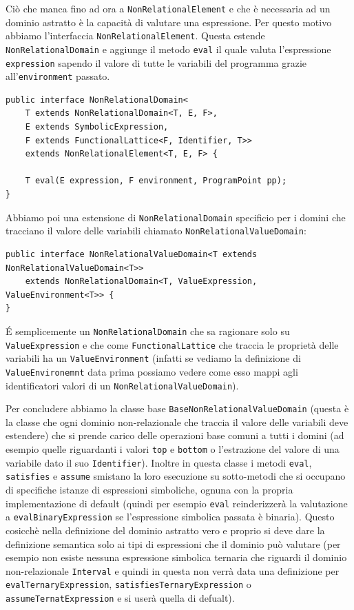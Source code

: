 \noindent Ciò che manca fino ad ora a \texttt{NonRelationalElement} e che è necessaria ad un dominio astratto è la capacità di valutare una espressione. Per questo motivo abbiamo l'interfaccia \texttt{NonRelationalElement}. Questa estende \texttt{NonRelationalDomain} e aggiunge il metodo \texttt{eval} il quale valuta l'espressione \texttt{expression} sapendo il valore di tutte le variabili del programma grazie all'\texttt{environment} passato.
\begin{lstlisting}[belowskip=-1.1 \baselineskip]
public interface NonRelationalDomain<
    T extends NonRelationalDomain<T, E, F>,
    E extends SymbolicExpression,
    F extends FunctionalLattice<F, Identifier, T>>
    extends NonRelationalElement<T, E, F> {

    T eval(E expression, F environment, ProgramPoint pp);
}
\end{lstlisting}
Abbiamo poi una estensione di \texttt{NonRelationalDomain} specificio per i domini che tracciano il valore delle variabili chiamato \texttt{NonRelationalValueDomain}:
\begin{lstlisting}[belowskip=-1.1 \baselineskip]
public interface NonRelationalValueDomain<T extends NonRelationalValueDomain<T>>
    extends NonRelationalDomain<T, ValueExpression, ValueEnvironment<T>> {
}
\end{lstlisting}
\'E semplicemente un \texttt{NonRelationalDomain} che sa ragionare solo su \texttt{ValueExpression} e che come \texttt{FunctionalLattice} che traccia le proprietà delle variabili ha un \texttt{ValueEnvironment} (infatti se vediamo la definizione di \texttt{ValueEnvironemnt} data prima possiamo vedere come esso mappi agli identificatori valori di un \texttt{NonRelationalValueDomain}).

Per concludere abbiamo la classe base \texttt{BaseNonRelationalValueDomain} (questa è la classe che ogni dominio non-relazionale che traccia il valore delle variabili deve estendere) che si prende carico delle operazioni base comuni a tutti i domini (ad esempio quelle riguardanti i valori \texttt{top} e \texttt{bottom} o l'estrazione del valore di una variabile dato il suo \texttt{Identifier}). Inoltre in questa classe i metodi \texttt{eval}, \texttt{satisfies} e \texttt{assume} smistano la loro esecuzione su sotto-metodi che si occupano di specifiche istanze di espressioni simboliche, ognuna con la propria implementazione di default (quindi per esempio \texttt{eval} reinderizzerà la valutazione a \texttt{evalBinaryExpression} se l'espressione simbolica passata è binaria). Questo cosicchè nella definizione del dominio astratto vero e proprio si deve dare la definizione semantica solo ai tipi di espressioni che il dominio può valutare (per esempio non esiste nessuna espressione simbolica ternaria che riguardi il dominio non-relazionale \texttt{Interval} e quindi in questa non verrà data una definizione per \texttt{evalTernaryExpression}, \texttt{satisfiesTernaryExpression} o \texttt{assumeTernatExpression} e si userà quella di defualt). 

